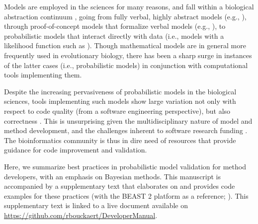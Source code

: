\documentclass[oneside]{article}
\begin{document}
Models are employed in the sciences for many reasons, and fall within
a biological abstraction continuum \citep{servedio14}, going from
fully verbal, highly abstract models (e.g., \citealt{vanvalen73}),
through proof-of-concept models that formalize verbal models (e.g.,
\citealt{maynard78,reinhold99,mendes18}), to probabilistic models that
interact directly with data (i.e., models with a likelihood function
such as \citealt{yule24,felsenstein73,hky,hudson90}).
Though mathematical models are in general more frequently used in
evolutionary biology, there has been a sharp surge in instances of the
latter cases (i.e., probabilistic models) in conjunction with
computational tools implementing them.

Despite the increasing pervasiveness of probabilistic models in the
biological sciences, tools implementing such models show large
variation not only with respect to code quality (from a software engineering
perspective), but also correctness \citep{darriba18}.
This is unsurprising given the multidisciplinary nature of model and method
development, and the challenges inherent to software research funding
\citep{siepel19}.
The bioinformatics community is thus in dire need of resources that
provide guidance for code improvement and validation.

Here, we summarize best practices in probabilistic model validation for method
developers, with an emphasis on Bayesian methods.
This manuscript is accompanied by a supplementary text that elaborates
on and provides code examples for these practices (with the BEAST 2
platform as a reference; \citealp{beast25}).
This supplementary text is linked to a live document available on
\href{https://github.com/rbouckaert/DeveloperManual}{https://github.com/rbouckaert/DeveloperManual}.


\end{document}
